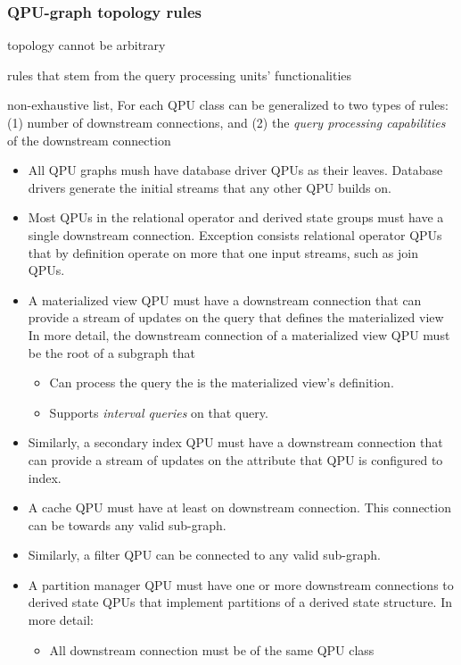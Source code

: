 
\subsubsection{QPU-graph topology rules}
topology cannot be arbitrary

rules that stem from the query processing units' functionalities

non-exhaustive list,
For each QPU class can be generalized to two types of rules:
(1) number of downstream connections, and (2) the \textit{query processing capabilities} of the downstream connection

\begin{itemize}
  \item All QPU graphs mush have database driver QPUs as their leaves.
  Database drivers generate the initial streams that any other QPU builds on.

  \item Most QPUs in the relational operator and derived state groups must have a single downstream connection.
  Exception consists relational operator QPUs that by definition operate on more that one input streams, such as join QPUs.

  \item A materialized view QPU must have a downstream connection that can provide a stream of updates on the query
  that defines the materialized view
  In more detail, the downstream connection of a materialized view QPU must be the root of a subgraph that
  \begin{itemize}
    \item Can process the query the is the materialized view's definition.
    \item Supports \textit{interval queries} on that query.
  \end{itemize}

  \item Similarly, a secondary index QPU must have a downstream connection that can provide a stream of updates on the
  attribute that QPU is configured to index.

  \item A cache QPU must have at least on downstream connection.
  This connection can be towards any valid sub-graph.

  \item Similarly, a filter QPU can be connected to any valid sub-graph.

  \item A partition manager QPU must have one or more downstream connections to derived state QPUs that implement
  partitions of a derived state structure.
  In more detail:
  \begin{itemize}
    \item All downstream connection must be of the same QPU class


\end{itemize}
\end{itemize}
